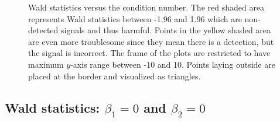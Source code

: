 \documentclass[11pt,a4paper,twoside]{book}\usepackage[]{graphicx}\usepackage[]{xcolor}
\begin{document}
\begin{figure}[H]
\begin{subfigure}[b]{1\textwidth}
\end{subfigure}
\vspace*{-1cm}
\caption{Wald statistics versus the condition number. The red shaded area represents Wald statistics between -1.96 and 1.96 which are non-detected signals and thus harmful. Points in the yellow shaded area are even more troublesome since they mean there is a detection, but the signal is incorrect. The frame of the plots are restricted to have maximum $y$-axis range between -10 and 10. Points laying outside are placed at the border and visualized as triangles.}
\label{fig:simres_wald1}
\end{figure}
\vspace*{-1cm}
\subsection{Wald statistics: $\beta_1=0$ and $\beta_2=0$}
\end{document}

